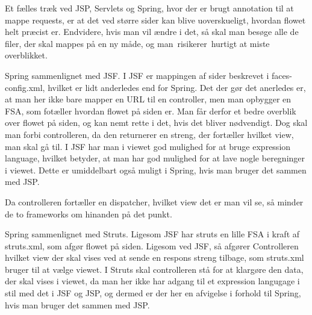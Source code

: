 \documentclass[a4paper,10pt]{article}
\begin{document}
Et fælles træk ved JSP, Servlets og Spring, hvor der er brugt annotation til at mappe requests, er at det ved større sider kan blive uoverskueligt, hvordan flowet helt præcist er. Endvidere, hvis man vil ændre i det, så skal man besøge alle de filer, der skal mappes på en ny måde, og man risikerer hurtigt at miste overblikket.


Spring sammenlignet med JSF.
I JSF er mappingen af sider beskrevet i faces-config.xml, hvilket er lidt anderledes end for Spring. Det der gør det anerledes er, at man her ikke bare mapper en URL til en controller, men man opbygger en FSA, som fotæller hvordan flowet på siden er. Man får derfor et bedre overblik over flowet på siden, og kan nemt rette i det, hvis det bliver nødvendigt. Dog skal man forbi controlleren, da den returnerer en streng, der fortæller hvilket view, man skal gå til. I JSF har man i viewet god mulighed for at bruge expression language, hvilket betyder, at man har god mulighed for at lave nogle beregninger i viewet. Dette er umiddelbart også muligt i Spring, hvis man bruger det sammen med JSP.

Da controlleren fortæller en dispatcher, hvilket view det er man vil se, så minder de to frameworks om hinanden på det punkt.

Spring sammenlignet med Struts.
Ligesom JSF har struts en lille FSA i kraft af struts.xml, som afgør flowet på siden. Ligesom ved JSF, så afgører Controlleren hvilket view der skal vises ved at sende en respons streng tilbage, som struts.xml bruger til at vælge viewet. I Struts skal controlleren stå for at klargøre den data, der skal vises i viewet, da man her ikke har adgang til et expression langugage i stil med det i JSF og JSP, og dermed er der her en afvigelse i forhold til Spring, hvis man bruger det sammen med JSP.

\end{document}
